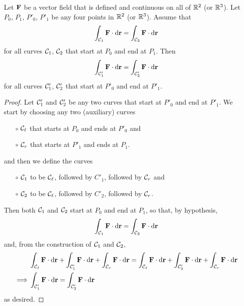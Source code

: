 \begin{theorem}\label{thm:pathIndepArbEndPoints}
Let $\mathbf{F}$ be a vector field that is defined and continuous on all of $\mathbb{R}^2$
(or $\mathbb{R}^3$). Let $P_0$, $P_1$, $P'_0$, $P'_1$ be any four points 
in $\mathbb{R}^2$ (or $\mathbb{R}^3$). Assume that 
\begin{equation*}
\int_{\mathcal{C}_1}\mathbf{F}\cdot\mathrm{d}\mathbf{r}=
\int_{\mathcal{C}_2}\mathbf{F}\cdot\mathrm{d}\mathbf{r}
\end{equation*}
for all curves $\mathcal{C}_1$, $\mathcal{C}_2$ that start at $P_0$ and end at $P_1$.
Then
\begin{equation*}
\int_{\mathcal{C}'_1}\mathbf{F}\cdot\mathrm{d}\mathbf{r}=
\int_{\mathcal{C}'_2}\mathbf{F}\cdot\mathrm{d}\mathbf{r}
\end{equation*}
for all curves $\mathcal{C}'_1$, $\mathcal{C}'_2$ that start at $P'_0$ and end at $P'_1$.
\end{theorem}
\begin{proof}
Let $\mathcal{C}'_1$ and $\mathcal{C}'_2$ be any two curves that start at $P'_0$ and 
end at $P'_1$. 
We start by choosing any two (auxiliary) curves 
\begin{itemize}\itemsep1pt \parskip0pt  %
\item[$\circ$]
$\mathcal{C}_\ell$ that starts at $P_0$ and ends at $P'_0$ and
\item[$\circ$]
$\mathcal{C}_r$ that starts at $P'_1$ and ends at $P_1$.
\end{itemize}
and then we define the curves 
\begin{itemize}\itemsep1pt \parskip0pt  %
\item[$\circ$]
$\mathcal{C}_1$ to be $\mathcal{C}_\ell$, followed by $C'_1$, followed by $\mathcal{C}_r$ and
\item[$\circ$]
$\mathcal{C}_2$ to be $\mathcal{C}_\ell$, followed by $C'_2$, followed by $\mathcal{C}_r$.
\end{itemize}
Then both $\mathcal{C}_1$ and $\mathcal{C}_2$ start at $P_0$ and end at $P_1$, so that, 
by hypothesis,
\begin{equation*}
\int_{\mathcal{C}_1}\mathbf{F}\cdot\mathrm{d}\mathbf{r}=
\int_{\mathcal{C}_2}\mathbf{F}\cdot\mathrm{d}\mathbf{r}
\end{equation*}
and, from the construction of $\mathcal{C}_1$ and $\mathcal{C}_2$,
\begin{align*}
&\int_{\mathcal{C}_\ell}\mathbf{F}\cdot\mathrm{d}\mathbf{r}
+\int_{\mathcal{C}'_1}\mathbf{F}\cdot\mathrm{d}\mathbf{r}
+\int_{\mathcal{C}_r}\mathbf{F}\cdot\mathrm{d}\mathbf{r}=
\int_{\mathcal{C}_\ell}\mathbf{F}\cdot\mathrm{d}\mathbf{r}
+\int_{\mathcal{C}'_2}\mathbf{F}\cdot\mathrm{d}\mathbf{r}
+\int_{\mathcal{C}_r}\mathbf{F}\cdot\mathrm{d}\mathbf{r} \\
\implies & \int_{\mathcal{C}'_1}\mathbf{F}\cdot\mathrm{d}\mathbf{r}=
\int_{\mathcal{C}'_2}\mathbf{F}\cdot\mathrm{d}\mathbf{r}
\end{align*}
as desired.
\end{proof}

